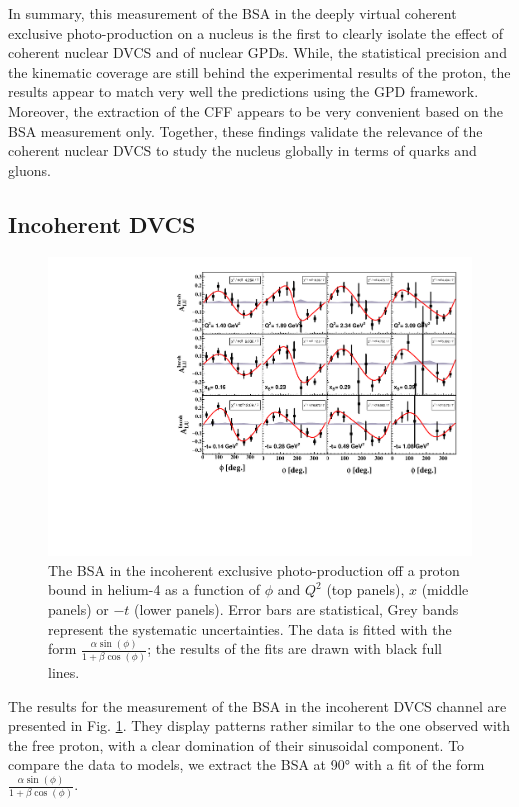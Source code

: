 \documentclass{article}
\begin{document}
In summary, this measurement of the BSA in the deeply virtual coherent exclusive 
photo-production on a nucleus is the first to clearly isolate the effect of 
coherent nuclear DVCS and of nuclear GPDs. While, the statistical precision and 
the kinematic coverage are still behind the experimental results of
the proton, the results appear to match very well the predictions using the GPD 
framework. Moreover, the extraction of the CFF appears to be very convenient based
on the BSA measurement only. Together, these findings  validate the relevance of the 
coherent nuclear DVCS to study the nucleus globally in terms of quarks and 
gluons. 

\subsection{Incoherent DVCS}

\begin{figure}[bp!]
\center
\includegraphics[width=15cm]{fig3/incoherent_ALU_phi.pdf}
	\caption{The BSA in the incoherent exclusive photo-production off a proton bound in
	helium-4 as a function of $\phi$ and $Q^2$ 
	(top panels), $x$ (middle panels) or $-t$ (lower panels). Error bars are  
	statistical, Grey bands represent the systematic uncertainties. The data is fitted with the 
	form $\frac{\alpha \sin(\phi)}{1+\beta \cos(\phi)}$; the results of the 
	fits are drawn with black full lines.}
\label{fig:InCohALUphi}
\end{figure}

The results for the measurement of the BSA in the incoherent DVCS channel are presented in
Fig. \ref{fig:InCohALUphi}. They display patterns rather similar to the one observed with the 
free proton, with a clear domination of their sinusoidal component. To compare the data to 
models, we extract the BSA at 90° with a fit of the form $\frac{\alpha \sin(\phi)}{1+\beta \cos(\phi)}$. 
\end{document}
